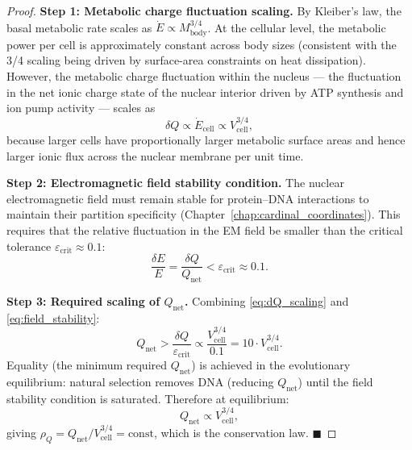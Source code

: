 \begin{proof}
\textbf{Step 1: Metabolic charge fluctuation scaling.}
By Kleiber's law, the basal metabolic rate scales as
$\dot{E} \propto M_{\mathrm{body}}^{3/4}$. At the cellular level, the
metabolic power per cell is approximately constant across body sizes
(consistent with the 3/4 scaling being driven by surface-area constraints
on heat dissipation). However, the metabolic charge fluctuation within
the nucleus --- the fluctuation in the net ionic charge state of the
nuclear interior driven by ATP synthesis and ion pump activity ---
scales as
\begin{equation}
  \delta Q \propto \dot{E}_{\mathrm{cell}} \propto V_{\mathrm{cell}}^{3/4},
  \label{eq:dQ_scaling}
\end{equation}
because larger cells have proportionally larger metabolic surface areas
and hence larger ionic flux across the nuclear membrane per unit time.

\textbf{Step 2: Electromagnetic field stability condition.}
The nuclear electromagnetic field must remain stable for protein--DNA
interactions to maintain their partition specificity
(Chapter~\ref{chap:cardinal_coordinates}). This requires that the
relative fluctuation in the EM field be smaller than the critical
tolerance $\varepsilon_{\mathrm{crit}} \approx 0.1$:
\begin{equation}
  \frac{\delta E}{E} = \frac{\delta Q}{Q_{\mathrm{net}}} < \varepsilon_{\mathrm{crit}} \approx 0.1.
  \label{eq:field_stability}
\end{equation}

\textbf{Step 3: Required scaling of $Q_{\mathrm{net}}$.}
Combining \eqref{eq:dQ_scaling} and \eqref{eq:field_stability}:
\begin{equation}
  Q_{\mathrm{net}} > \frac{\delta Q}{\varepsilon_{\mathrm{crit}}}
    \propto \frac{V_{\mathrm{cell}}^{3/4}}{0.1}
    = 10 \cdot V_{\mathrm{cell}}^{3/4}.
  \label{eq:Q_scaling}
\end{equation}
Equality (the minimum required $Q_{\mathrm{net}}$) is achieved in the
evolutionary equilibrium: natural selection removes DNA (reducing
$Q_{\mathrm{net}}$) until the field stability condition is saturated.
Therefore at equilibrium:
\begin{equation}
  Q_{\mathrm{net}} \propto V_{\mathrm{cell}}^{3/4},
  \label{eq:Q_propto}
\end{equation}
giving $\rho_Q = Q_{\mathrm{net}} / V_{\mathrm{cell}}^{3/4} = \mathrm{const}$,
which is the conservation law. $\blacksquare$
\end{proof}

